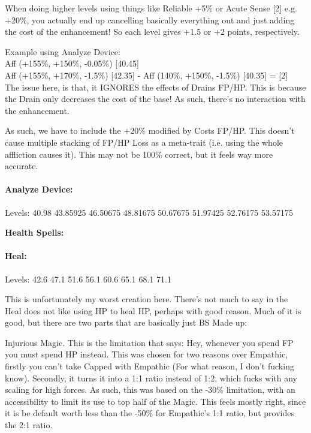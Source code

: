 \begin{multicols*}{2}
	When doing higher levels using things like Reliable +5\% or Acute Sense [2] e.g. +20\%, you actually end up cancelling basically everything out and just adding the cost of the enhancement! So each level gives +1.5 or +2 points, respectively.
	
	Example using Analyze Device:\\
	Aff (+155\%, +150\%, -0.05\%) [40.45]\\
	Aff (+155\%, +170\%, -1.5\%) [42.35] - Aff (140\%, +150\%, -1.5\%) [40.35] = [2]\\
	
	The issue here, is that, it IGNORES the effects of Drains FP/HP. This is because the Drain only decreases the cost of the base! As such, there's no interaction with the enhancement.
	
	As such, we have to include the +20\% modified by Costs FP/HP. This doesn't cause multiple stacking of FP/HP Loss as a meta-trait (i.e. using the whole affliction causes it). This may not be 100\% correct, but it feels way more accurate.
	
	\paragraph{Analyze Device:} Levels: 40.98 43.85925 46.50675 48.81675 50.67675 51.97425 52.76175 53.57175
	
	
	\textbf{Health Spells:\\}
	
	\paragraph{Heal:} Levels: 42.6 47.1 51.6 56.1 60.6 65.1 68.1 71.1
	
	This is unfortunately my worst creation here. There's not much to say in the Heal does not like using HP to heal HP, perhaps with good reason. Much of it is good, but there are two parts that are basically just BS Made up:
	
	Injurious Magic. This is the limitation that says: Hey, whenever you spend FP you must spend HP instead. This was chosen for two reasons over Empathic, firstly you can't take Capped with Empathic (For what reason, I don't fucking know). Secondly, it turns it into a 1:1 ratio instead of 1:2, which fucks with any scaling for high forces. As such, this was based on the -30\% limitation, with an accessibility to limit its use to top half of the Magic. This feels mostly right, since it is be default worth less than the -50\% for Empathic's 1:1 ratio, but provides the 2:1 ratio.
	

\end{multicols*}
